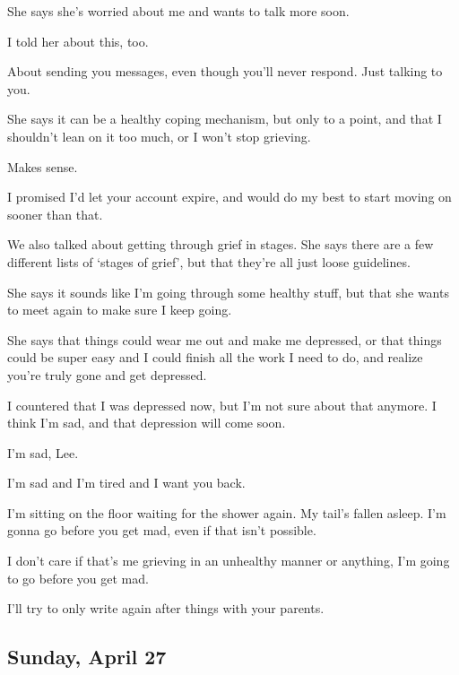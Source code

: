 { She says she's worried about me and wants to talk more soon.

 I told her about this, too.

 About sending you messages, even though you'll never respond. Just talking to you.

 She says it can be a healthy coping mechanism, but only to a point, and that I shouldn't lean on it too much, or I won't stop grieving.

 Makes sense.

 I promised I'd let your account expire, and would do my best to start moving on sooner than that.

 We also talked about getting through grief in stages. She says there are a few different lists of `stages of grief', but that they're all just loose guidelines.

 She says it sounds like I'm going through some healthy stuff, but that she wants to meet again to make sure I keep going.

 She says that things could wear me out and make me depressed, or that things could be super easy and I could finish all the work I need to do, and realize you're truly gone and get depressed.

 I countered that I was depressed now, but I'm not sure about that anymore. I think I'm sad, and that depression will come soon.

 I'm sad, Lee.

 I'm sad and I'm tired and I want you back.

 I'm sitting on the floor waiting for the shower again. My tail's fallen asleep. I'm gonna go before you get mad, even if that isn't possible.

 I don't care if that's me grieving in an unhealthy manner or anything, I'm going to go before you get mad.

 I'll try to only write again after things with your parents.

\newpage

\subsection*{Sunday, April 27}\label{sunday-april-27}

}
